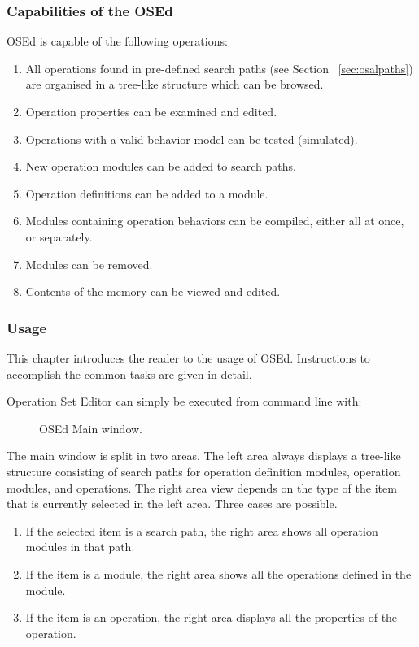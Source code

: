 \documentclass[twoside]{tceusermanual}
\begin{document}
\subsubsection{Capabilities of the OSEd}

OSEd is capable of the following operations:

\begin{enumerate}
\item%
  All operations found in pre-defined search paths (see Section
  ~\ref{sec:osalpaths}) are organised in a tree-like structure which can be
  browsed.
\item%
  Operation properties can be examined and edited.
\item%
  Operations with a valid behavior model can be tested (simulated).
\item%
  New operation modules can be added to search paths.
\item%
  Operation definitions can be added to a module.
\item%
  Modules containing operation behaviors can be compiled, either all at
  once, or separately.
\item%
  Modules can be removed.
\item%
  Contents of the memory can be viewed and edited.
\end{enumerate}

\subsubsection{Usage}

This chapter introduces the reader to the usage of OSEd. Instructions to
accomplish the common tasks are given in detail.

Operation Set Editor can simply be executed from command line with:


\begin{figure}[tb]
\centerline{}
\caption{OSEd Main window.}
\label{fig:osed_main_window}
\end{figure}

The main window is split in two areas. The left area always displays a
tree-like structure consisting of search paths for operation definition
modules, operation modules, and operations.  The right area view depends on the
type of the item that is currently selected in the left area. Three cases are
possible.
%
\begin{enumerate}
\item %
  If the selected item is a search path, the right area shows all operation
modules in that path.
\item %
  If the item is a module, the right area shows all the operations defined
  in the module.
\item %
  If the item is an operation, the right area displays all the properties of
  the operation.
\end{enumerate}
\end{document}
